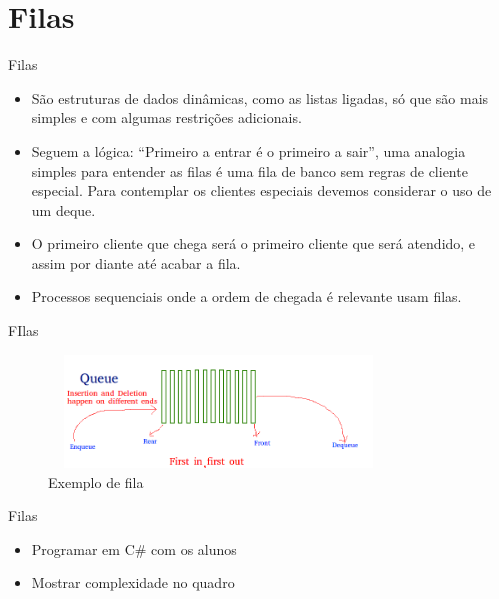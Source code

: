 \section{Filas}

\begin{frame}
	\begin{block}{Filas}
		\begin{itemize}
			\item São estruturas de dados dinâmicas, como as listas ligadas, só que são mais simples e com algumas restrições adicionais.
			
			\item Seguem a lógica: “Primeiro a entrar é o primeiro a sair”, uma analogia simples para entender as filas é uma fila de banco sem regras de cliente especial. Para contemplar os clientes especiais devemos considerar o uso de um deque.
			
			\item O primeiro cliente que chega será o primeiro cliente que será atendido, e assim por diante até acabar a fila.
			
			\item Processos sequenciais onde a ordem de chegada é relevante usam filas. 
		\end{itemize}
	\end{block}
\end{frame}


\begin{frame}
	\begin{block}{FIlas}
		\begin{figure}[!htb]
			\centering	  				
			\includegraphics[height=3cm, width = 9cm]{./pic/queue.png}
			\caption{Exemplo de fila \cite{GEEKS_2018}}
			\label{fig_LLS_one}
		\end{figure}
	\end{block}
\end{frame}

\begin{frame}
	\begin{block}{Filas}
		\begin{itemize}
			\item Programar em C\# com os alunos
			\item Mostrar complexidade no quadro
		\end{itemize}
	\end{block}
\end{frame}